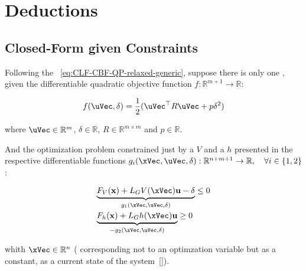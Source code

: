 
%

\chapter{Deductions}
\label{app:deductions}


\section{Closed-Form  given  Constraints}
\label{app:CL_QP_CLF-CBF}

Following the ~\ref{eq:CLF-CBF-QP-relaxed-generic}, suppose there is only one , given the differentiable quadratic objective function \(f:\mathbb{R}^{m+1} \to \mathbb{R}\):

\begin{equation}
    f(\uVec, \delta) = \frac{1}{2} (\uVec^\top R \uVec + p\delta^2 )
    \label{eq:objective_function}
\end{equation}

where \(\uVec \in \mathbb{R}^m\), \(\delta \in \mathbb{R}\), \( R \in \mathbb{R}^{m \times m}\) and \(p \in \mathbb{R}\). \par

And the optimization problem constrained just by a  \(V\) and a  \(h\) presented in the respective differentiable functions \(g_i(\xVec, \uVec, \delta): \mathbb{R}^{n+m+1} \to \mathbb{R}, \quad \forall i \in \{1,2\} \):

\begin{equation}
    \begin{array}{l}
     \underbrace{F_V(\mathbf{x}) + L_GV(\xVec)\mathbf{u} - \delta }_{g_1(\xVec, \uVec, \delta)}\leq  0 \vspace{0.25em}\\
     \underbrace{F_h(\mathbf{x}) + L_Gh(\xVec)\mathbf{u}}_{\mathbf{-}g_2(\xVec, \uVec, \delta)} \geq 0   
    \end{array}
    \label{eq:constraint_function}
\end{equation}

whith \(\xVec \in \mathbb{R}^n\) ( corresponding not to an optimzation variable but as a constant, as a current state of the system~\ref{}). \par

